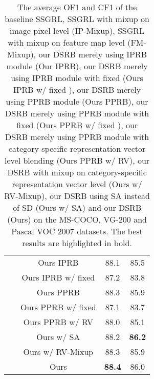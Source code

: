 \documentclass[lettersize,journal]{IEEEtran}
\begin{document}
\begin{table}[!t]
\begin{tabular}{c|c|cc}
  \centering ~ & Ours IPRB & 88.1 & 85.5 \\
  \centering ~ & Ours IPRB w/ fixed  & 87.2 & 83.8 \\
  \centering ~ & Ours PPRB & 88.3 & 85.9 \\
  \centering ~ & Ours PPRB w/ fixed  & 87.1 & 83.7 \\
  \centering ~ & Ours PPRB w/ RV & 88.0 & 85.1 \\
  \centering ~ & Ours w/ SA & 88.2 & \textbf{86.2} \\
  \centering ~ & Ours w/ RV-Mixup & 88.3 & 85.9 \\
  \centering ~ & Ours & \textbf{88.4} & 86.0 \\
  \hline
  \end{tabular}
  \vspace{10pt}
  \caption{The average OF1 and CF1 of the baseline SSGRL, SSGRL with mixup on image pixel level (IP-Mixup), SSGRL with mixup on feature map level (FM-Mixup), our DSRB merely using IPRB module (Our IPRB), our DSRB merely using IPRB module with fixed  (Ours IPRB w/ fixed ), our DSRB merely using PPRB module (Ours PPRB), our DSRB merely using PPRB module with fixed  (Ours PPRB w/ fixed ), our DSRB merely using PPRB module with category-specific representation vector level blending (Ours PPRB w/ RV), our DSRB with mixup on category-specific representation vector level (Ours w/ RV-Mixup), our DSRB using SA instead of SD (Ours w/ SA) and our DSRB (Ours) on the MS-COCO, VG-200 and Pascal VOC 2007 datasets. The best results are highlighted in bold.}
  \label{tab:average-ablation-results}
\end{table}
\end{document}
